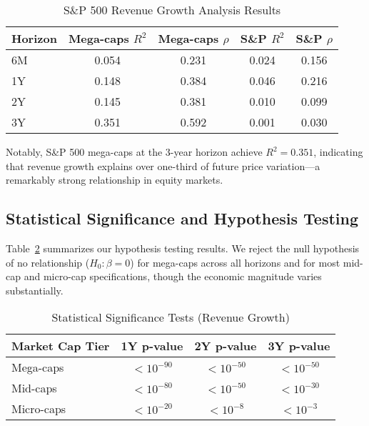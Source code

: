 \documentclass[11pt]{article}
\begin{document}
\begin{table}[!htbp]
\centering
\caption{S\&P 500 Revenue Growth Analysis Results}
\label{tab:index-results}
\begin{tabular}{lcccc}
\toprule
Horizon & Mega-caps $R^2$ & Mega-caps $\rho$ & S\&P $R^2$ & S\&P $\rho$ \\
\midrule
6M & 0.054 & 0.231 & 0.024 & 0.156 \\
1Y & 0.148 & 0.384 & 0.046 & 0.216 \\
2Y & 0.145 & 0.381 & 0.010 & 0.099 \\
3Y & 0.351 & 0.592 & 0.001 & 0.030 \\
\bottomrule
\end{tabular}
\end{table}

\vspace{1em}
\FloatBarrier

Notably, S\&P 500 mega-caps at the 3-year horizon achieve $R^2 = 0.351$, indicating that revenue growth explains over one-third of future price variation—a remarkably strong relationship in equity markets.

\subsection{Statistical Significance and Hypothesis Testing}

Table~\ref{tab:hypothesis-tests} summarizes our hypothesis testing results. We reject the null hypothesis of no relationship ($H_0: \beta = 0$) for mega-caps across all horizons and for most mid-cap and micro-cap specifications, though the economic magnitude varies substantially.

\begin{table}[!htbp]
\small
\centering
\caption{Statistical Significance Tests (Revenue Growth)}
\label{tab:hypothesis-tests}
\begin{tabular}{lccc}
\toprule
Market Cap Tier & 1Y p-value & 2Y p-value & 3Y p-value \\
\midrule
Mega-caps & $< 10^{-90}$ & $< 10^{-50}$ & $< 10^{-50}$ \\
Mid-caps  & $< 10^{-80}$ & $< 10^{-50}$ & $< 10^{-30}$ \\
Micro-caps & $< 10^{-20}$ & $< 10^{-8}$ & $< 10^{-3}$ \\
\bottomrule
\end{tabular}
\end{table}

\FloatBarrier
\end{document}
